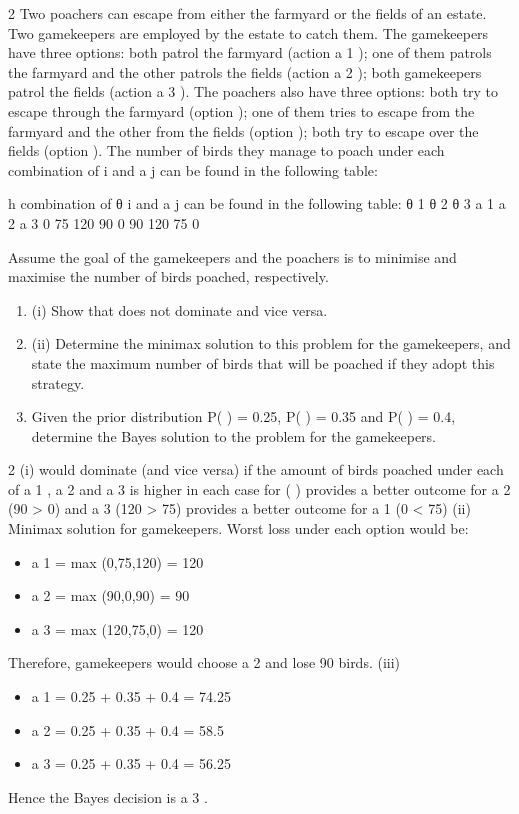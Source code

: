 \documentclass[a4paper,12pt]{article}
\begin{document}
2
Two poachers can escape from either the farmyard or the fields of an estate. Two gamekeepers are employed by the estate to catch them. The gamekeepers have three options: both patrol the farmyard (action a 1 ); one of them patrols the farmyard and the
other patrols the fields (action a 2 ); both gamekeepers patrol the fields (action a 3 ). The poachers also have three options: both try to escape through the farmyard (option  ); one of them tries to escape from the farmyard and the other from the fields (option  ); both try to escape over the fields (option  ). The number of birds they manage to poach under each combination of \theta i and a j can be found in the following table:

h combination of θ i and a j can be found in the following table:
θ 1
θ 2
θ 3
a 1 a 2 a 3
0
75
120 90
0
90 120
75
0

Assume the goal of the gamekeepers and the poachers is to minimise and maximise
the number of birds poached, respectively.
\begin{enumerate}
\item (i) Show that  does not dominate  and vice versa.
\item (ii) Determine the minimax solution to this problem for the gamekeepers, and
state the maximum number of birds that will be poached if they adopt this
strategy.
\item Given the prior distribution P( ) = 0.25, P( ) = 0.35 and P( ) = 0.4,
determine the Bayes solution to the problem for the gamekeepers.
\end{enumerate}

2
(i)
 would dominate  (and vice versa) if the amount of birds poached under
each of a 1 , a 2 and a 3 is higher in each case for  ( )
 provides a better outcome for a 2 (90 > 0) and a 3 (120 > 75)
 provides a better outcome for a 1 (0 < 75)
(ii)
Minimax solution for gamekeepers. Worst loss under each option would be:
\begin{itemize}
\item a 1 = max (0,75,120) = 120
\item a 2 = max (90,0,90) = 90
\item a 3 = max (120,75,0) = 120
\end{itemize}

Therefore, gamekeepers would choose a 2 and lose 90 birds.
(iii)
\begin{itemize}
\item a 1 = 0.25  + 0.35  + 0.4  = 74.25
\item a 2 = 0.25  + 0.35  + 0.4  = 58.5
\item a 3 = 0.25  + 0.35  + 0.4  = 56.25
\end{itemize}
Hence the Bayes decision is a 3 .
\end{document}
